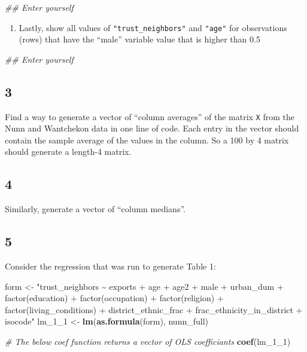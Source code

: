 \documentclass[
]{book}
\newenvironment{Shaded}{\begin{snugshade}}{\end{snugshade}}
\newcommand{\CommentTok}[1]{\textcolor[rgb]{0.56,0.35,0.01}{\textit{#1}}}
\newcommand{\DecValTok}[1]{\textcolor[rgb]{0.00,0.00,0.81}{#1}}
\newcommand{\KeywordTok}[1]{\textcolor[rgb]{0.13,0.29,0.53}{\textbf{#1}}}
\newcommand{\NormalTok}[1]{#1}
\newcommand{\StringTok}[1]{\textcolor[rgb]{0.31,0.60,0.02}{#1}}
\providecommand{\tightlist}{%
  \setlength{\itemsep}{0pt}\setlength{\parskip}{0pt}}
\theoremstyle{definition}
\theoremstyle{definition}
\theoremstyle{definition}
\theoremstyle{remark}
\begin{document}
\begin{Shaded}
\begin{Highlighting}[]
\CommentTok{\#\# Enter yourself}
\end{Highlighting}
\end{Shaded}

\begin{enumerate}
\def\labelenumi{\alph{enumi})}
\setcounter{enumi}{2}
\tightlist
\item
  Lastly, show all values of \texttt{"trust\_neighbors"} and \texttt{"age"} for observations (rows) that have the ``male'' variable value that is higher than 0.5
\end{enumerate}

\begin{Shaded}
\begin{Highlighting}[]
\CommentTok{\#\# Enter yourself}
\end{Highlighting}
\end{Shaded}

\hypertarget{section-11}{%
\subsection*{3}\label{section-11}}

Find a way to generate a vector of ``column averages'' of the matrix \texttt{X} from the Nunn and Wantchekon data in one line of code. Each entry in the vector should contain the sample average of the values in the column. So a 100 by 4 matrix should generate a length-4 matrix.

\hypertarget{section-12}{%
\subsection*{4}\label{section-12}}

Similarly, generate a vector of ``column medians''.

\hypertarget{section-13}{%
\subsection*{5}\label{section-13}}

Consider the regression that was run to generate Table 1:

\begin{Shaded}
\begin{Highlighting}[]
\NormalTok{form <{-}}\StringTok{ "trust\_neighbors \textasciitilde{} exports + age + age2 +  male + urban\_dum + factor(education) + factor(occupation) + factor(religion) + factor(living\_conditions) + district\_ethnic\_frac + frac\_ethnicity\_in\_district + isocode"}
\NormalTok{lm\_}\DecValTok{1}\NormalTok{\_}\DecValTok{1}\NormalTok{ <{-}}\StringTok{ }\KeywordTok{lm}\NormalTok{(}\KeywordTok{as.formula}\NormalTok{(form), nunn\_full)}

\CommentTok{\# The below coef function returns a vector of OLS coefficiants}
\KeywordTok{coef}\NormalTok{(lm\_}\DecValTok{1}\NormalTok{\_}\DecValTok{1}\NormalTok{)}
\end{Highlighting}
\end{Shaded}
\end{document}
